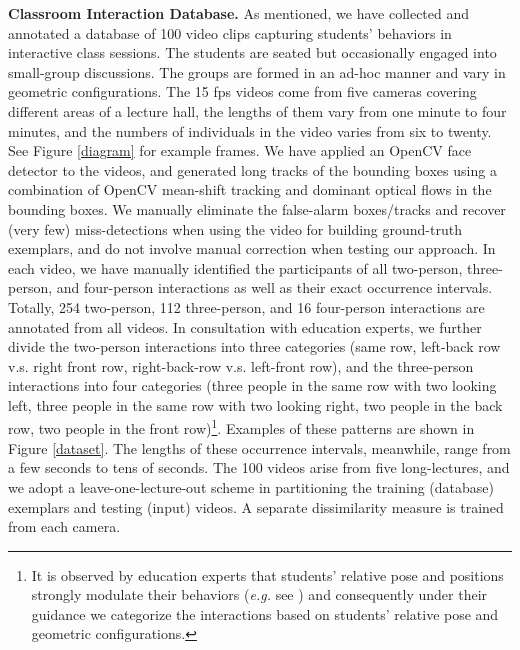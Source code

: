 \documentclass[10pt,twocolumn,letterpaper]{article}
\begin{document}
\noindent\textbf{Classroom Interaction Database.} As mentioned, we have collected and annotated a database of 100 video clips capturing students' behaviors in interactive class sessions. The students are seated but occasionally engaged into small-group discussions. The groups are formed in an ad-hoc manner and vary in geometric configurations. The 15 fps videos come from five cameras covering different areas of a lecture hall, the lengths of them vary from one minute to four minutes, and the numbers of individuals in the video varies from six to twenty. See Figure \ref{diagram} for example frames. We have applied an OpenCV face detector to the videos, and generated long tracks of the bounding boxes using a combination of OpenCV mean-shift tracking and dominant optical flows in the bounding boxes. We manually eliminate the false-alarm boxes/tracks and recover (very few) miss-detections when using the video for building ground-truth exemplars, and do not involve manual correction when testing our approach. In each video, we have manually identified the participants of all two-person, three-person, and four-person interactions as well as their exact occurrence intervals. Totally, 254 two-person, 112 three-person, and 16 four-person interactions are annotated from all videos. In consultation with education experts, we further divide the two-person interactions into three categories (same row, left-back row v.s. right front row, right-back-row v.s. left-front row), and the three-person interactions into four categories (three people in the same row with two looking left, three people in the same row with two looking right, two people in the back row, two people in the front row)\footnote{It is observed by education experts that students' relative pose and positions strongly modulate their behaviors (\textit{e.g.} see \cite{Crouch:PI}) and consequently under their guidance we categorize the interactions based on students' relative pose and geometric configurations.}. Examples of these patterns are shown in Figure \ref{dataset}. The lengths of these occurrence intervals, meanwhile, range from a few seconds to tens of seconds. The 100 videos arise from five long-lectures, and we adopt a leave-one-lecture-out scheme in partitioning the training (database) exemplars and testing (input) videos. A separate dissimilarity measure is trained from each camera.
\end{document}
